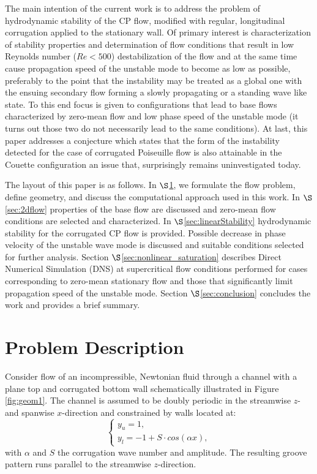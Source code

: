 \documentclass[lineno]{jfm}
\begin{document}
The main intention of the current work is to address the problem of hydrodynamic stability of the CP flow, modified with regular, longitudinal corrugation applied to the stationary wall.
Of primary interest is characterization of stability properties and determination of flow conditions that result in low Reynolds number ($Re<500$) destabilization of the flow and at the same time cause propagation speed of the unstable mode to become as low as possible,
preferably to the point that the instability may be treated as a global one with the ensuing secondary flow forming a slowly propagating or a standing wave like state.
To this end focus is given to configurations that lead to base flows characterized by zero-mean flow and low phase speed of the unstable mode (it turns out those two do not necessarily lead to the same conditions). 
At last, this paper addresses a conjecture which states that the form of the instability detected for the case of corrugated Poiseuille flow \citep{Nikesh2017} is also attainable in the Couette configuration
an issue that, surprisingly remains uninvestigated today.

The layout of this paper is as follows. In $\S$\ref{sec:problemDes}, we formulate the flow problem, define geometry, and discuss the computational approach used in this work. In $\S$\ref{sec:2dflow} properties of the base flow are discussed and zero-mean flow conditions are selected and characterized.
In $\S$\ref{sec:linearStability} hydrodynamic stability for the corrugated CP flow is provided.
Possible decrease in phase velocity of the unstable wave mode is discussed and suitable conditions selected for further analysis.
Section $\S$\ref{sec:nonlinear_saturation} describes Direct Numerical Simulation (DNS) at supercritical flow conditions performed for cases corresponding to zero-mean stationary flow and those that significantly limit propagation speed of the unstable mode.
Section $\S$\ref{sec:conclusion} concludes the work and provides a brief summary.

\section{Problem Description}\label{sec:problemDes}
Consider flow of an incompressible, Newtonian fluid through a channel with a plane top and corrugated bottom wall schematically illustrated in Figure \ref{fig:geom1}.
The channel is assumed to be doubly periodic in the streamwise $z$- and spanwise $x$-direction and constrained by walls located at:
\begin{equation}
\begin{cases}
y_{u} = 1,  \\
y_{l}= -1 + S\cdot cos(\alpha x),
\end{cases}
\label{eq:wall}
\end{equation}
with $\alpha$ and $S$ the corrugation wave number and amplitude. The resulting groove pattern runs parallel to the streamwise $z$-direction.
\end{document}
